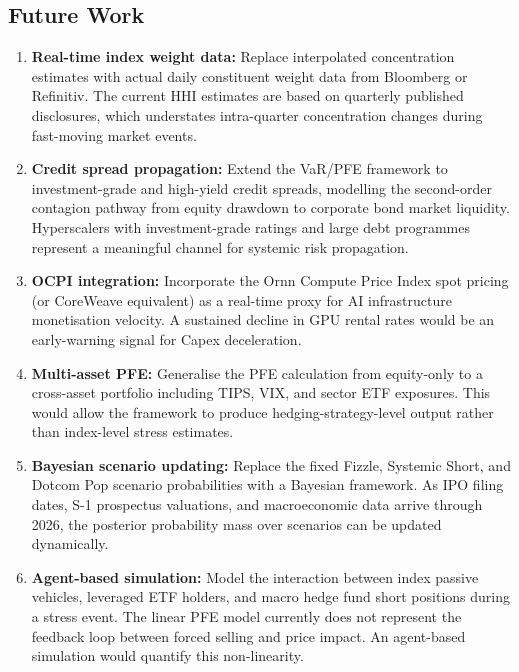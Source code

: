 \subsection{Future Work}

\begin{enumerate}
  \item \textbf{Real-time index weight data:} Replace interpolated concentration
        estimates with actual daily constituent weight data from Bloomberg or Refinitiv.
        The current HHI estimates are based on quarterly published disclosures, which
        understates intra-quarter concentration changes during fast-moving market events.
  \item \textbf{Credit spread propagation:} Extend the VaR/PFE framework to
        investment-grade and high-yield credit spreads, modelling the second-order
        contagion pathway from equity drawdown to corporate bond market liquidity.
        Hyperscalers with investment-grade ratings and large debt programmes represent
        a meaningful channel for systemic risk propagation.
  \item \textbf{OCPI integration:} Incorporate the Ornn Compute Price Index spot pricing
        (or CoreWeave equivalent) as a real-time proxy for AI infrastructure
        monetisation velocity. A sustained decline in GPU rental rates would be an
        early-warning signal for Capex deceleration.
  \item \textbf{Multi-asset PFE:} Generalise the PFE calculation from equity-only to a
        cross-asset portfolio including TIPS, VIX, and sector ETF exposures. This would
        allow the framework to produce hedging-strategy-level output rather than index-level
        stress estimates.
  \item \textbf{Bayesian scenario updating:} Replace the fixed Fizzle, Systemic Short,
        and Dotcom Pop scenario probabilities with a Bayesian framework. As IPO filing
        dates, S-1 prospectus valuations, and macroeconomic data arrive through 2026,
        the posterior probability mass over scenarios can be updated dynamically.
  \item \textbf{Agent-based simulation:} Model the interaction between index passive
        vehicles, leveraged ETF holders, and macro hedge fund short positions during a
        stress event. The linear PFE model currently does not represent the
        feedback loop between forced selling and price impact. An agent-based
        simulation would quantify this non-linearity.
\end{enumerate}
